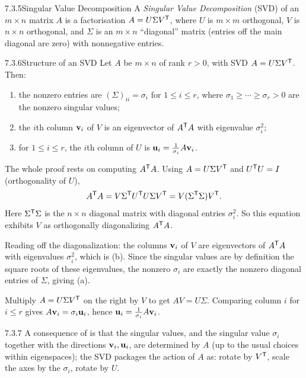 \begin{defns}{7.3.5}{Singular Value Decomposition}
A \emph{Singular Value Decomposition} (SVD) of an $m\times n$ matrix $A$ is a factorisation $A=U\Sigma V^{\mathsf{T}}$, where $U$ is $m\times m$ orthogonal, $V$ is $n\times n$ orthogonal, and $\Sigma$ is an $m\times n$ ``diagonal'' matrix (entries off the main diagonal are zero) with nonnegative entries.
\end{defns}

\begin{thms}{7.3.6}{Structure of an SVD}
Let $A$ be $m\times n$ of rank $r>0$, with SVD $A=U\Sigma V^{\mathsf{T}}$. Then:
\begin{enumerate}[label=\textup{(\alph*)},leftmargin=2.2em,itemsep=1pt]
\item the nonzero entries are $(\Sigma)_{ii}=\sigma_i$ for $1\le i\le r$, where $\sigma_1\ge\cdots\ge\sigma_r>0$ are the nonzero singular values;
\item the $i$th column $\mathbf{v}_i$ of $V$ is an eigenvector of $A^{\mathsf{T}} A$ with eigenvalue $\sigma_i^2$;
\item for $1\le i\le r$, the $i$th column of $U$ is $\mathbf{u}_i=\tfrac{1}{\sigma_i}A\mathbf{v}_i$.
\end{enumerate}
\end{thms}

\begin{prf}
The whole proof rests on computing $A^{\mathsf{T}} A$. Using $A=U\Sigma V^{\mathsf{T}}$ and $U^{\mathsf{T}} U=I$ (orthogonality of $U$),
\[
A^{\mathsf{T}} A=V\Sigma^{\mathsf{T}} U^{\mathsf{T}} U\Sigma V^{\mathsf{T}}=V(\Sigma^{\mathsf{T}}\Sigma)V^{\mathsf{T}}.
\]
Here $\Sigma^{\mathsf{T}}\Sigma$ is the $n\times n$ diagonal matrix with diagonal entries $\sigma_i^2$. So this equation exhibits $V$ as orthogonally diagonalizing $A^{\mathsf{T}} A$.

 Reading off the diagonalization: the columns $\mathbf{v}_i$ of $V$ are eigenvectors of $A^{\mathsf{T}} A$ with eigenvalues $\sigma_i^2$, which is (b). Since the singular values are by definition the square roots of these eigenvalues, the nonzero $\sigma_i$ are exactly the nonzero diagonal entries of $\Sigma$, giving (a).

 Multiply $A=U\Sigma V^{\mathsf{T}}$ on the right by $V$ to get $AV=U\Sigma$. Comparing column $i$ for $i\le r$ gives $A\mathbf{v}_i=\sigma_i\mathbf{u}_i$, hence $\mathbf{u}_i=\tfrac{1}{\sigma_i}A\mathbf{v}_i$.
\end{prf}

\begin{rmks}{7.3.7}
A consequence of  is that the singular values, and the singular value $\sigma_i$ together with the directions $\mathbf{v}_i,\mathbf{u}_i$, are determined by $A$ (up to the usual choices within eigenspaces); the SVD packages the action of $A$ as: rotate by $V^{\mathsf{T}}$, scale the axes by the $\sigma_i$, rotate by $U$.
\end{rmks}

